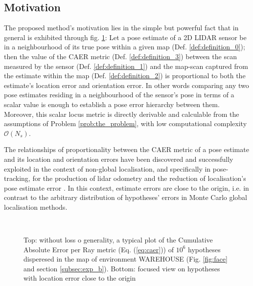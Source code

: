 \subsection{Motivation}
\label{subsec:motivation}

The proposed method's motivation lies in the simple but powerful fact that in
general is exhibited through fig. \ref{fig:motivation_caer}: Let a pose
estimate of a 2D LIDAR sensor be in a neighbourhood of its true pose within a
given map (Def. \ref{def:definition_0}); then the value of the CAER metric
(Def.  \ref{def:definition_3}) between the scan measured by the sensor (Def.
\ref{def:definition_1}) and the map-scan captured from the estimate within the
map (Def. \ref{def:definition_2}) is proportional to both the estimate's
location error and orientation error. In other words comparing any two pose
estimates residing in a neighbourhood of the sensor's pose in terms of a scalar
value is enough to establish a pose error hierarchy between them. Moreover,
this scalar locus metric is directly derivable and calculable from the
assumptions of Problem \ref{prob:the_problem}, with low computational
complexity $\mathcal{O}(N_s)$.

The relationships of proportionality between the CAER metric of a pose
estimate and its location and orientation errors have been discovered and
successfully exploited in the context of non-global localisation, and
specifically in pose-tracking, for the production of lidar odometry
\cite{Filotheou2022f} and the reduction of localisation's pose estimate error
\cite{Filotheou2023a}. In this context, estimate errors are close to the
origin, i.e. in contrast to the arbitrary distribution of hypotheses' errors in
Monte Carlo global localisation methods.


\begin{figure}\vspace{-1.5cm}
  \subfloat{\hspace{0.5cm}}\vspace{-1.5cm}\\
  \subfloat{\hspace{-0.3cm}}
  \caption{\small Top: without loss o generality, a typical plot of the
           Cumulative Absolute Error per Ray metric (Eq. (\ref{eq:caer})) of
           $10^6$ hypotheses disperesed in the map of environment WAREHOUSE
           (Fig. \ref{fig:face} and section \ref{subsec:exp_b}). Bottom:
           focused view on hypotheses with location error close to the origin}
  \vspace{-0.5cm}
  \label{fig:motivation_caer}
\end{figure}



